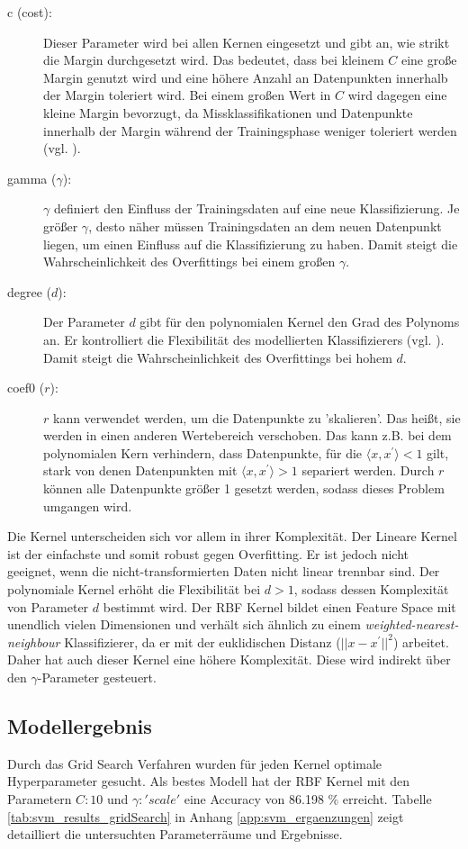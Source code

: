 \begin{description}
	\item[c (cost):]
	Dieser Parameter wird bei allen Kernen eingesetzt und gibt an, wie strikt die Margin durchgesetzt wird. Das bedeutet, dass bei kleinem $C$ eine große Margin genutzt wird und eine höhere Anzahl an Datenpunkten innerhalb der Margin toleriert wird. Bei einem großen Wert in $C$ wird dagegen eine kleine Margin bevorzugt, da Missklassifikationen und Datenpunkte innerhalb der Margin während der Trainingsphase weniger toleriert werden (vgl. \cite{2015_aggarwal}).
	\item[gamma ($\gamma$):]
	$\gamma$ definiert den Einfluss der Trainingsdaten auf eine neue Klassifizierung. Je größer $\gamma$, desto näher müssen Trainingsdaten an dem neuen Datenpunkt liegen, um einen Einfluss auf die Klassifizierung zu haben. Damit steigt die Wahrscheinlichkeit des Overfittings bei einem großen $\gamma$.
	\item[degree ($d$):]
	Der Parameter $d$ gibt für den polynomialen Kernel den Grad des Polynoms an. Er kontrolliert die Flexibilität des modellierten Klassifizierers (vgl. \cite{2009_ben_hur}). Damit steigt die Wahrscheinlichkeit des Overfittings bei hohem $d$.
	\item[coef0 ($r$):]
	$r$ kann verwendet werden, um die Datenpunkte zu 'skalieren'. Das heißt, sie werden in einen anderen Wertebereich verschoben. Das kann z.B. bei dem polynomialen Kern verhindern, dass Datenpunkte, für die $\langle x,x^{'}\rangle<1$ gilt, stark von denen Datenpunkten mit $\langle x,x^{'}\rangle > 1$ separiert werden. Durch $r$ können alle Datenpunkte größer 1 gesetzt werden, sodass dieses Problem umgangen wird.
\end{description}
Die Kernel unterscheiden sich vor allem in ihrer Komplexität. Der Lineare Kernel ist der einfachste und somit robust gegen Overfitting. Er ist jedoch nicht geeignet, wenn die nicht-transformierten Daten nicht linear trennbar sind. Der polynomiale Kernel erhöht die Flexibilität bei $d>1$, sodass dessen Komplexität von Parameter $d$ bestimmt wird. Der RBF Kernel bildet einen Feature Space mit unendlich vielen Dimensionen und verhält sich ähnlich zu einem \emph{weighted-nearest-neighbour} Klassifizierer, da er mit der euklidischen Distanz ($||x-x^{'}||^{2}$) arbeitet. Daher hat auch dieser Kernel eine höhere Komplexität. Diese wird indirekt über den $\gamma$-Parameter gesteuert.
\subsection{Modellergebnis}
Durch das Grid Search Verfahren wurden für jeden Kernel optimale Hyperparameter gesucht. Als bestes Modell hat der RBF Kernel mit den Parametern $C: 10$ und $\gamma: 'scale'$ eine Accuracy von 86.198 \% erreicht. Tabelle \ref{tab:svm_results_gridSearch} in Anhang \ref{app:svm_ergaenzungen} zeigt detailliert die untersuchten Parameterräume und Ergebnisse.
